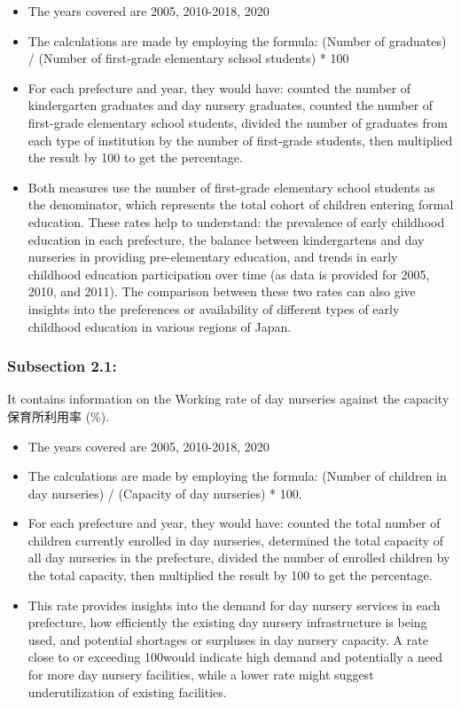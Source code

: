 \documentclass[
  12pt,
  letterpaper,
  DIV=11,
  numbers=noendperiod]{scrartcl}
\begin{document}
\begin{itemize}
\item
  The years covered are 2005, 2010-2018, 2020
\item
  The calculations are made by employing the formula: (Number of
  graduates) / (Number of first-grade elementary school students) * 100
\item
  For each prefecture and year, they would have: counted the number of
  kindergarten graduates and day nursery graduates, counted the number
  of first-grade elementary school students, divided the number of
  graduates from each type of institution by the number of first-grade
  students, then multiplied the result by 100 to get the percentage.
\item
  Both measures use the number of first-grade elementary school students
  as the denominator, which represents the total cohort of children
  entering formal education. These rates help to understand: the
  prevalence of early childhood education in each prefecture, the
  balance between kindergartens and day nurseries in providing
  pre-elementary education, and trends in early childhood education
  participation over time (as data is provided for 2005, 2010, and
  2011). The comparison between these two rates can also give insights
  into the preferences or availability of different types of early
  childhood education in various regions of Japan.
\end{itemize}

\hypertarget{subsection-2.1}{%
\subsubsection{Subsection 2.1:}\label{subsection-2.1}}

It contains information on the Working rate of day nurseries against the
capacity 保育所利用率 (\%).

\begin{itemize}
\item
  The years covered are 2005, 2010-2018, 2020
\item
  The calculations are made by employing the formula: (Number of
  children in day nurseries) / (Capacity of day nurseries) * 100.
\item
  For each prefecture and year, they would have: counted the total
  number of children currently enrolled in day nurseries, determined the
  total capacity of all day nurseries in the prefecture, divided the
  number of enrolled children by the total capacity, then multiplied the
  result by 100 to get the percentage.
\item
  This rate provides insights into the demand for day nursery services
  in each prefecture, how efficiently the existing day nursery
  infrastructure is being used, and potential shortages or surpluses in
  day nursery capacity. A rate close to or exceeding 100would indicate
  high demand and potentially a need for more day nursery facilities,
  while a lower rate might suggest underutilization of existing
  facilities.
\end{itemize}
\end{document}
